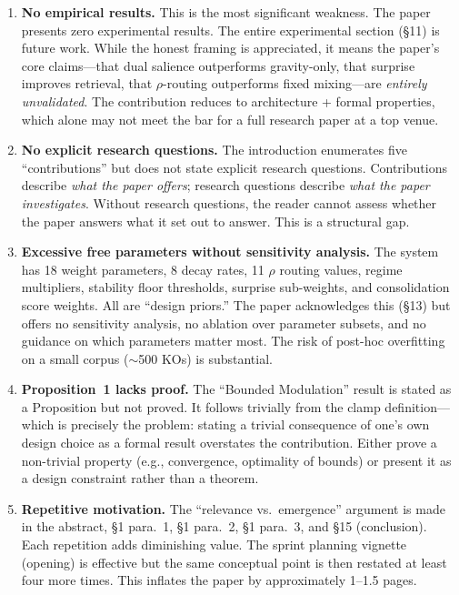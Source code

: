 \documentclass[11pt,a4paper]{article}
\begin{document}
\begin{enumerate}[label=\textbf{W\arabic*.}, leftmargin=2cm]

\item \textbf{No empirical results.} This is the most significant weakness. The paper presents zero experimental results. The entire experimental section (\S11) is future work. While the honest framing is appreciated, it means the paper's core claims---that dual salience outperforms gravity-only, that surprise improves retrieval, that $\rho$-routing outperforms fixed mixing---are \emph{entirely unvalidated}. The contribution reduces to architecture + formal properties, which alone may not meet the bar for a full research paper at a top venue.

\item \textbf{No explicit research questions.} The introduction enumerates five ``contributions'' but does not state explicit research questions. Contributions describe \emph{what the paper offers}; research questions describe \emph{what the paper investigates}. Without research questions, the reader cannot assess whether the paper answers what it set out to answer. This is a structural gap.

\item \textbf{Excessive free parameters without sensitivity analysis.} The system has 18 weight parameters, 8 decay rates, 11 $\rho$ routing values, regime multipliers, stability floor thresholds, surprise sub-weights, and consolidation score weights. All are ``design priors.'' The paper acknowledges this (\S13) but offers no sensitivity analysis, no ablation over parameter subsets, and no guidance on which parameters matter most. The risk of post-hoc overfitting on a small corpus ($\sim$500 KOs) is substantial.

\item \textbf{Proposition~1 lacks proof.} The ``Bounded Modulation'' result is stated as a Proposition but not proved. It follows trivially from the clamp definition---which is precisely the problem: stating a trivial consequence of one's own design choice as a formal result overstates the contribution. Either prove a non-trivial property (e.g., convergence, optimality of bounds) or present it as a design constraint rather than a theorem.

\item \textbf{Repetitive motivation.} The ``relevance vs.\ emergence'' argument is made in the abstract, \S1 para.~1, \S1 para.~2, \S1 para.~3, and \S15 (conclusion). Each repetition adds diminishing value. The sprint planning vignette (opening) is effective but the same conceptual point is then restated at least four more times. This inflates the paper by approximately 1--1.5 pages.


\end{enumerate}
\end{document}
